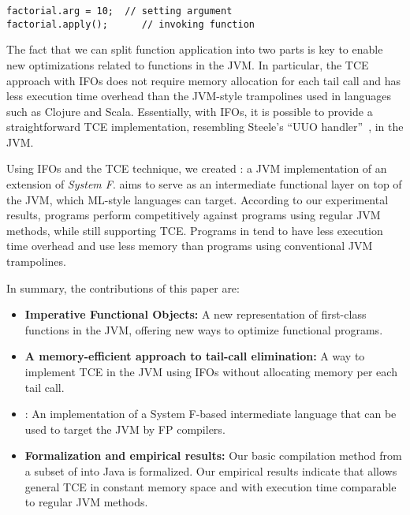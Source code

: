 \begin{lstlisting}
factorial.arg = 10;  // setting argument
factorial.apply();      // invoking function
\end{lstlisting}

The fact that we can split function application into two parts is key
to enable new optimizations related to functions
in the JVM. In particular, the TCE
approach with IFOs does not require memory allocation for each tail
call and has less execution time overhead than the JVM-style trampolines used in languages
such as Clojure and Scala. Essentially, with IFOs, it is possible to
provide a straightforward TCE implementation, resembling Steele's ``UUO
handler''~\cite{Steele1978}, in the JVM.

Using IFOs and the TCE technique, we created
\Name: a JVM implementation of an extension of \emph{System
  F}.
\name aims to serve as an intermediate functional layer on top
of the JVM, which ML-style languages can target. According to our experimental results,
\name programs perform competitively against programs using regular JVM methods,
while still supporting TCE. Programs in \name tend to have
less execution time overhead
and use less memory than programs using conventional
JVM trampolines.

In summary, the contributions of this paper are:

\begin{itemize}

\item {\bf Imperative Functional Objects:} A new representation of
  first-class functions in the JVM, offering new ways to
  optimize functional programs.

\item {\bf A memory-efficient approach to tail-call elimination:} A way to
  implement TCE in the JVM using IFOs without allocating memory per each tail call.

\item \Name: An implementation of a System F-based
  intermediate language that can be used to target the JVM by FP
  compilers.

\item {\bf Formalization and empirical results:} Our basic compilation
  method from a subset of \name into Java is formalized. Our empirical
  results indicate that \name allows general TCE in constant memory space
  and with execution time comparable to regular JVM methods.

\end{itemize}
